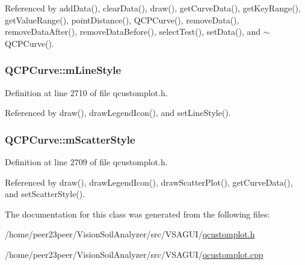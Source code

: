 Referenced by add\+Data(), clear\+Data(), draw(), get\+Curve\+Data(), get\+Key\+Range(), get\+Value\+Range(), point\+Distance(), Q\+C\+P\+Curve(), remove\+Data(), remove\+Data\+After(), remove\+Data\+Before(), select\+Test(), set\+Data(), and $\sim$\+Q\+C\+P\+Curve().

\hypertarget{class_q_c_p_curve_ae1f35ae2b15aee8e15bcdfec5be95156}{}
\subsubsection[{m\+Line\+Style}]{ Q\+C\+P\+Curve\+::m\+Line\+Style\hspace{0.3cm}{\ttfamily [protected]}}\label{class_q_c_p_curve_ae1f35ae2b15aee8e15bcdfec5be95156}


Definition at line 2710 of file qcustomplot.\+h.



Referenced by draw(), draw\+Legend\+Icon(), and set\+Line\+Style().

\hypertarget{class_q_c_p_curve_a08f803b4a30b01bbd7a1eab15d0f864f}{}
\subsubsection[{m\+Scatter\+Style}]{ Q\+C\+P\+Curve\+::m\+Scatter\+Style\hspace{0.3cm}{\ttfamily [protected]}}\label{class_q_c_p_curve_a08f803b4a30b01bbd7a1eab15d0f864f}


Definition at line 2709 of file qcustomplot.\+h.



Referenced by draw(), draw\+Legend\+Icon(), draw\+Scatter\+Plot(), get\+Curve\+Data(), and set\+Scatter\+Style().



The documentation for this class was generated from the following files\+:\begin{DoxyCompactItemize}
\item 
/home/peer23peer/\+Vision\+Soil\+Analyzer/src/\+V\+S\+A\+G\+U\+I/\hyperlink{qcustomplot_8h}{qcustomplot.\+h}\item 
/home/peer23peer/\+Vision\+Soil\+Analyzer/src/\+V\+S\+A\+G\+U\+I/\hyperlink{qcustomplot_8cpp}{qcustomplot.\+cpp}\end{DoxyCompactItemize}
